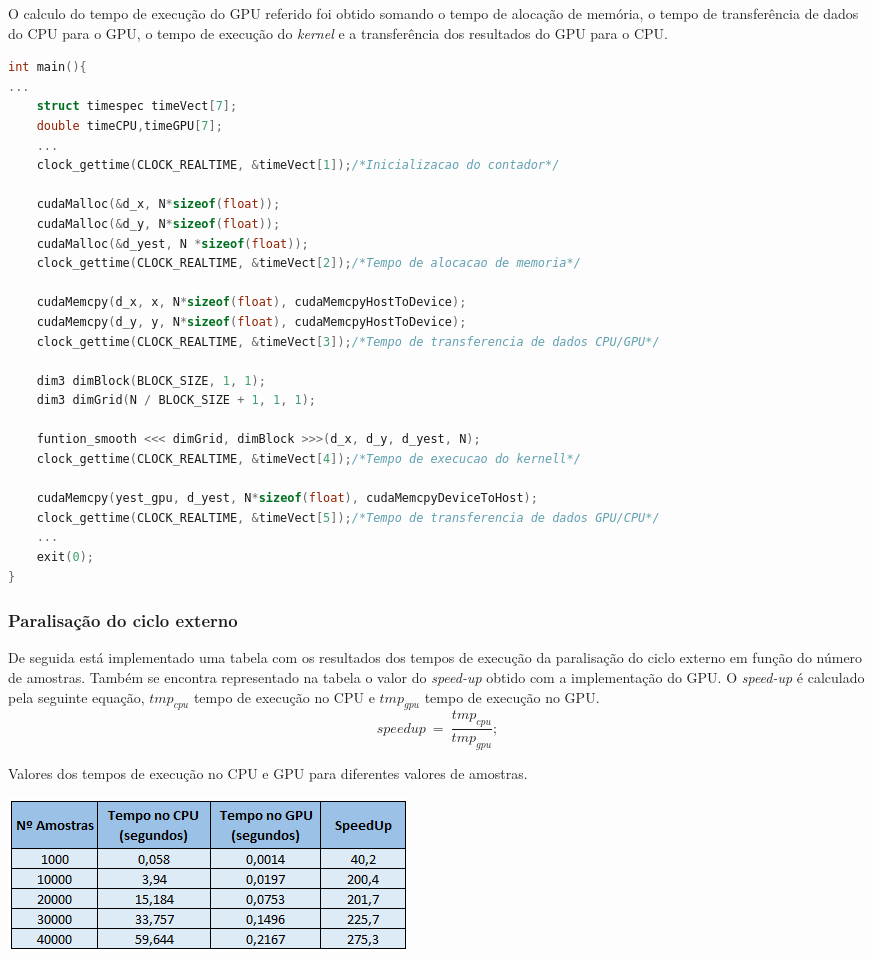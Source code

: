 \documentclass[11pt]{article}
\numberwithin{equation}{section}
\begin{document}
O calculo do tempo de execução do GPU referido foi obtido somando o tempo de alocação de memória, o tempo de transferência de dados do CPU para o GPU, o tempo de execução do \textit{kernel} e a transferência dos resultados do GPU para o CPU.
\begin{lstlisting}[language=C]
int main(){
...
	struct timespec timeVect[7];
	double timeCPU,timeGPU[7];
	...
	clock_gettime(CLOCK_REALTIME, &timeVect[1]);/*Inicializacao do contador*/
	
	cudaMalloc(&d_x, N*sizeof(float));
	cudaMalloc(&d_y, N*sizeof(float));
	cudaMalloc(&d_yest, N *sizeof(float));
	clock_gettime(CLOCK_REALTIME, &timeVect[2]);/*Tempo de alocacao de memoria*/
	
	cudaMemcpy(d_x, x, N*sizeof(float), cudaMemcpyHostToDevice);
	cudaMemcpy(d_y, y, N*sizeof(float), cudaMemcpyHostToDevice);
	clock_gettime(CLOCK_REALTIME, &timeVect[3]);/*Tempo de transferencia de dados CPU/GPU*/
	
	dim3 dimBlock(BLOCK_SIZE, 1, 1);
	dim3 dimGrid(N / BLOCK_SIZE + 1, 1, 1);
	
	funtion_smooth <<< dimGrid, dimBlock >>>(d_x, d_y, d_yest, N);
	clock_gettime(CLOCK_REALTIME, &timeVect[4]);/*Tempo de execucao do kernell*/
	
	cudaMemcpy(yest_gpu, d_yest, N*sizeof(float), cudaMemcpyDeviceToHost);
	clock_gettime(CLOCK_REALTIME, &timeVect[5]);/*Tempo de transferencia de dados GPU/CPU*/
	...
	exit(0);
}
\end{lstlisting}
\subsubsection{Paralisação do ciclo externo}
De seguida está implementado uma tabela com os resultados dos tempos de execução da paralisação do ciclo externo em função do número de amostras. Também se encontra representado  na tabela o valor do \textit{speed-up} obtido com a implementação do GPU.
O \textit{speed-up} é calculado pela seguinte equação, $tmp_{cpu}$ tempo de execução no CPU e $tmp_{gpu}$ tempo de execução no GPU.
\vspace{-3mm}
\begin{equation}
	speedup~=~\frac{tmp_{cpu}}{tmp_{gpu}};
\end{equation}

\begin{table}[H]
	\centering
	\caption{Valores dos tempos de execução no CPU e GPU para diferentes valores de amostras.}
	\vspace{-1.5mm}
	\includegraphics[keepaspectratio=true, scale=0.8]{speedup}
\end{table}
\end{document}
